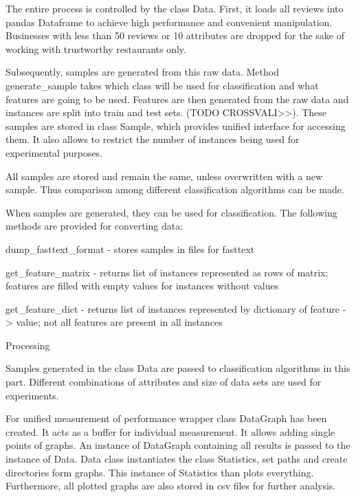 The entire process is controlled by the class Data. First, it loads all reviews into pandas Dataframe to achieve high performance and convenient manipulation. Businesses with less than 50 reviews or 10 attributes are dropped for the sake of working with trustworthy restaurants only.

Subsequently, samples are generated from this raw data. Method generate\_sample takes which class will be used for classification and what features are going to be used. Features are then generated from the raw data and instances are split into train and test sets. (TODO CROSSVALI>>). These samples are stored in class Sample, which provides unified interface for accessing them. It also allows to restrict the number of instances being used for experimental purposes.

All samples are stored and remain the same, unless overwritten with a new sample. Thus comparison among different classification algorithms can be made.

When samples are generated, they can be used for classification. The following methods are provided for converting data:

dump\_fasttext\_format - stores samples in files for fasttext

get\_feature\_matrix - returns list of instances represented as rows of matrix; features are filled with empty values for instances without values

get\_feature\_dict - returns list of instances represented by dictionary of feature -> value; not all features are present in all instances


Processing

Samples generated in the class Data are passed to classification algorithms in this part. Different combinations of attributes and size of data sets are used for experiments.

For unified measurement of performance wrapper class DataGraph has been created. It acts as a buffer for individual measurement. It allows adding single points of graphs. An instance of DataGraph containing all results is passed to the instance of Data. Data class instantiates the class Statistics, set paths and create directories form graphs. This instance of Statistics than plots everything. Furthermore, all plotted graphs are also stored in csv files for further analysis.

